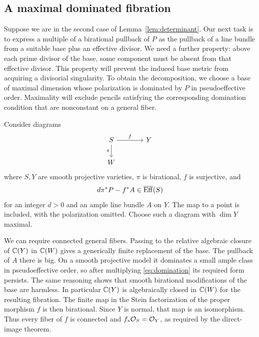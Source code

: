\subsection{A maximal dominated fibration}\label{subsec:maximal}

Suppose we are in the second case of Lemma~\ref{lem:determinant}. Our next task is to express a multiple of a birational pullback of $P$ as the pullback of a line bundle from a suitable base plus an effective divisor. We need a further property: above each prime divisor of the base, some component must be absent from that effective divisor. This property will prevent the induced base metric from acquiring a divisorial singularity. To obtain the decomposition, we choose a base of maximal dimension whose polarization is dominated by $P$ in pseudoeffective order. Maximality will exclude pencils satisfying the corresponding domination condition that are nonconstant on a general fiber.

Consider diagrams
\begin{equation}\label{eq:diagram}
\begin{tikzcd}[column sep=large]
S \arrow[r,"f"] \arrow[d,"\pi"'] & Y\\
W &
\end{tikzcd}
\end{equation}
where $S,Y$ are smooth projective varieties, $\pi$ is birational, $f$ is surjective, and
\begin{equation}\label{eq:domination}
d\pi^*P-f^*A\in\overline{\operatorname{Eff}}(S)
\end{equation}
for an integer $d>0$ and an ample line bundle $A$ on $Y$. The map to a point is included, with the polarization omitted. Choose such a diagram with $\dim Y$ maximal.

We can require connected general fibers. Passing to the relative algebraic closure of $\mathbb C(Y)$ in $\mathbb C(W)$ gives a generically finite replacement of the base. The pullback of $A$ there is big. On a smooth projective model it dominates a small ample class in pseudoeffective order, so after multiplying \eqref{eq:domination} its required form persists. The same reasoning shows that smooth birational modifications of the base are harmless. In particular $\mathbb C(Y)$ is algebraically closed in $\mathbb C(W)$ for the resulting fibration. The finite map in the Stein factorization of the proper morphism $f$ is then birational. Since $Y$ is normal, that map is an isomorphism. Thus every fiber of $f$ is connected and $f_*\mathcal O_S=\mathcal O_Y$, as required by the direct-image theorem.

